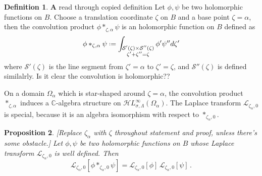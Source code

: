 \documentclass{article}
\newcommand{\singexp}[2]{\mathcal{H}L^\infty_{#1, #2}}
\newcommand{\C}{\mathbb{C}}
\newcommand*{\defeq}{\mathrel{\vcenter{\baselineskip0.5ex \lineskiplimit0pt
                     \hbox{\scriptsize.}\hbox{\scriptsize.}}}%
                     =}
\newcommand{\laplace}{\mathcal{L}}
\theoremstyle{definition}
\newtheorem{definition}{Definition}[section]
\theoremstyle{plain}
\newtheorem{prop}[definition]{Proposition}
\newenvironment{todo}{\color{Coral}}{\color{black}}
\begin{document}
\begin{definition}\label{def:convolution}
\begin{todo}\textbf{A} read through copied definition\end{todo} Let $\phi,\psi$ be two holomorphic functions on $B$. Choose a translation coordinate $\zeta$ on $B$ and a base point $\zeta=\alpha$, then the convolution product $\phi\ast_{\zeta,\alpha}\psi$ is an holomorphic function on $B$ defined as
\begin{equation}\label{eq:convolution_def}
\phi \ast_{\zeta, \alpha} \psi \defeq \int_{\substack{\mathcal{S}'(\zeta)\times\mathcal{S}''(\zeta)\\ \zeta'+\zeta''=\zeta}} \phi' \psi'' d\zeta'
\end{equation}
where $\mathcal{S}'(\zeta)$ is the line segment from $\zeta'=\alpha$ to $\zeta'=\zeta$, and $\mathcal{S}''(\zeta)$ is defined similalrly. \begin{todo}
    Is it clear the convolution is holomorphic??
\end{todo}  
\end{definition}
On a domain $\Omega_\alpha$ which is star-shaped around $\zeta = \alpha$, the convolution product $\ast_{\zeta, \alpha}$ induces a $\C$-algebra structure on $\singexp{\sigma}{\Lambda}(\Omega_\alpha)$. The Laplace transform $\laplace_{\zeta_\alpha, 0}$ is special, because it is an algebra isomorphism with respect to $\ast_{\zeta_\alpha, 0}$.
\begin{prop}\label{prop:convolution_iso_laplace}
\begin{todo}[Replace $\zeta_\alpha$ with $\zeta$ throughout statement and proof, unless there's some obstacle.]\end{todo} Let $\phi,\psi$ be two holomorphic functions on $B$ whose Laplace transform $\laplace_{\zeta_\alpha,0}$ is well defined. Then 
\begin{equation}
    \laplace_{\zeta_\alpha,0}[\phi\ast_{\zeta_\alpha,0}\psi]=\laplace_{\zeta_\alpha,0}[\phi]\,\laplace_{\zeta_\alpha,0}[\psi]\,.
\end{equation}
\end{prop}
\end{document}
